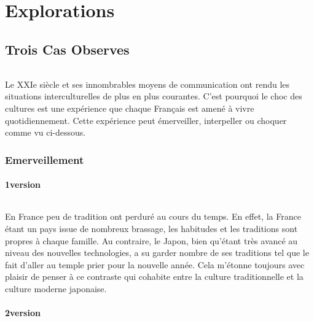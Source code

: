 \part{Explorations}
\chapter{Trois Cas Observes}
\paragraph{}
Le XXIe siècle et ses innombrables moyens de communication ont rendu les situations interculturelles de plus en plus courantes. C’est pourquoi le choc des cultures est une expérience que chaque Français est amené à vivre quotidiennement. Cette expérience peut émerveiller, interpeller ou choquer comme vu ci-dessous. 
 
\section{Emerveillement}

\subsection{1\ier version}
\paragraph{}
En France peu de tradition ont perduré au cours du temps. En effet, la France étant un pays issue de nombreux brassage, les habitudes et les traditions sont propres à chaque famille. Au contraire, le Japon, bien qu’étant très avancé au niveau des nouvelles technologies, a su garder nombre de ses traditions tel que le fait d’aller au temple prier pour la nouvelle année. Cela m’étonne toujours avec plaisir de penser à ce contraste qui cohabite entre la culture traditionnelle et la culture moderne japonaise.

\subsection{2\ieme version}
